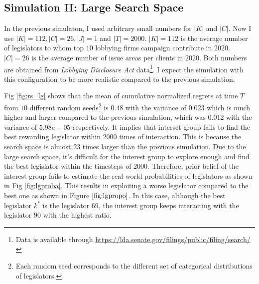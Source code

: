 \documentclass{article}
\begin{document}
\subsection{\large{Simulation II: Large Search Space}}\label{sim2}
In the previous simulaton, 
I used 
arbitrary small numbers for $|K|$ and $|C|$.
Now I use $|K|=112, |C|=26, |J|=1$ and $|T|=2000$.
$|K|=112$ is the average number of 
legislators to whom top 
$10$ lobbying firms campaign contribute in $2020$.
$|C|=26$ is the average number of
issue areas per clients in $2020$.
Both numbers are obtained from \textit{Lobbying Disclosure Act} data\footnote{Data is available through \url{https://lda.senate.gov/filings/public/filing/search/}}.
I expect the simulation with this configuration to be more realistic compared to the previous simulation.

Fig \ref{fig:rs_lg} shows that the mean of cumulative normalized regrets at time $T$ from 
$10$ different random seeds\footnote{Each random seed  
corresponds to the different set of categorical distributions of legislators. 
} is $0.48$ with the variance of $0.023$ which is much higher and larger compared to the previous simulation, which was $0.012$ with the variance of $5.98e-05$ respectively.
It implies that interset group fails to find the best rewarding legislator within $2000$ times of interaction.
This is because 
the search space is almost $23$ times larger than the previous simulation.
Due to the large search space, 
it's difficult for the interest group to 
explore enough and find the best legislator within the timesteps of $2000$.
Therefore, prior belief of the interest group fails to estimate 
the real world probabilities of legislators as shown in Fig \ref{fig:lgproba}.
This results in exploiting 
a worse legislator compared to the best one 
as shown in Figure $\ref{fig:lgpropo}$.
In this case, although the best legislator $k^*$ is the legislator $69$, 
the interest group keeps interacting with the legislator $90$ with the highest ratio. 
\end{document}
